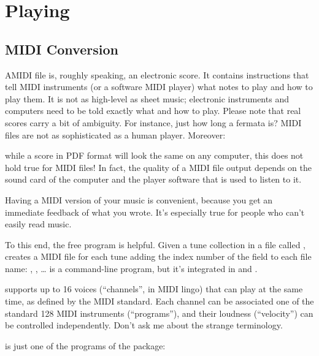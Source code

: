 \documentclass[a4paper,fullpage,12pt]{book}
\begin{document}

\chapter{Playing}
\label{sec:sound}

\section{MIDI Conversion}
\label{sec:midi}

\lettrine{A}{MIDI} file is, roughly speaking, an electronic score. It
contains instructions that tell MIDI instruments (or a software MIDI
player) what notes to play and how to play them. It is not as
high-level as sheet music; electronic instruments and computers need
to be told exactly what and how to play. Please note that real scores
carry a bit of ambiguity. For instance, just how long a fermata is?
MIDI files are not as sophisticated as a human player. Moreover:

\begin{vimp}

  while a score in PDF format will look the same on any computer, this
  does not hold true for MIDI files! In fact, the quality of a MIDI
  file output depends on the sound card of the computer and the player
  software that is used to listen to it.

\end{vimp}

Having a MIDI version of your \ABC{} music is convenient, because
you get an immediate feedback of what you wrote. It's especially true
for people who can't easily read music.

To this end, the free \abcmid{} program is helpful. Given a tune
collection in a file called , \abcmid{} creates a MIDI
file for each tune adding the index number of the  field to
each file name: , , {\ldots} \abcmid{}
is a command-line program, but it's integrated in \abcexplorer{} and
\jedabc.

\abcmid{} supports up to 16 voices (``channels'', in MIDI lingo) that
can play at the same time, as defined by the MIDI standard. Each
channel can be associated one of the standard 128 MIDI instruments
(``programs''), and their loudness (``velocity'') can be controlled
independently. Don't ask me about the strange terminology.

\abcmid{} is just one of the programs of the \abcMID{} package:
\end{document}
